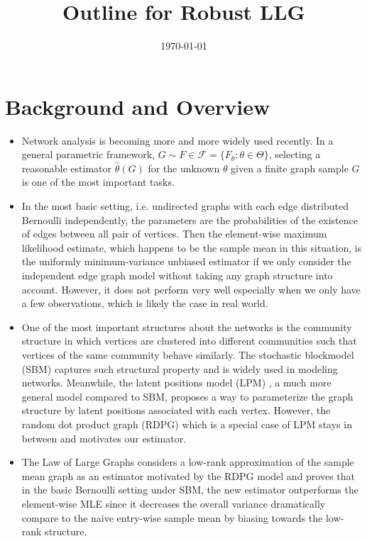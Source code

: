 \documentclass[a4paper]{article}
\title{Outline for Robust LLG}
\date{\today}
\renewcommand{\hat}{\widehat}
\begin{document}
\maketitle

\section{Background and Overview}

\begin{itemize}

\item Network analysis is becoming more and more widely used recently. In a general parametric framework, $G \sim F \in \mathcal{F} = \{F_{\theta} : \theta \in \Theta \}$, selecting a reasonable estimator $\hat{\theta}(G)$ for the unknown $\theta$ given a finite graph sample $G$ is one of the most important tasks.

\item In the most basic setting, i.e. undirected graphs with each edge distributed Bernoulli independently, the parameters are the probabilities of the existence of edges between all pair of vertices.
Then the element-wise maximum likelihood estimate, which happens to be the sample mean in this situation, is the uniformly minimum-variance unbiased estimator if we only consider the independent edge graph model \cite{bollobas2007phase} without taking any graph structure into account. However, it does not perform very well especially when we only have a few observations, which is likely the case in real world.

\item One of the most important structures about the networks is the community structure in which vertices are clustered into different communities such that vertices of the same community behave similarly. The stochastic blockmodel (SBM) \cite{holland1983stochastic} captures such structural property and is widely used in modeling networks.
Meanwhile, the latent positions model (LPM) \cite{hoff2002latent}, a much more general model compared to SBM, proposes a way to parameterize the graph structure by latent positions associated with each vertex. However, the random dot product graph (RDPG) \cite{young2007random, nickel2007random} which is a special case of LPM stays in between and motivates our estimator.

\item The Law of Large Graphs \cite{tang2016law} considers a low-rank approximation of the sample mean graph as an estimator motivated by the RDPG model and proves that in the basic Bernoulli setting under SBM, the new estimator outperforms the element-wise MLE since it decreases the overall variance dramatically compare to the naive entry-wise sample mean by biasing towards the low-rank structure. 


\end{itemize}
\end{document}
